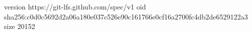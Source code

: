 version https://git-lfs.github.com/spec/v1
oid sha256:c0d0c5692d2a06a180e037c526e90c161766e0cf16a2700fc4db2de6529122a3
size 20152
